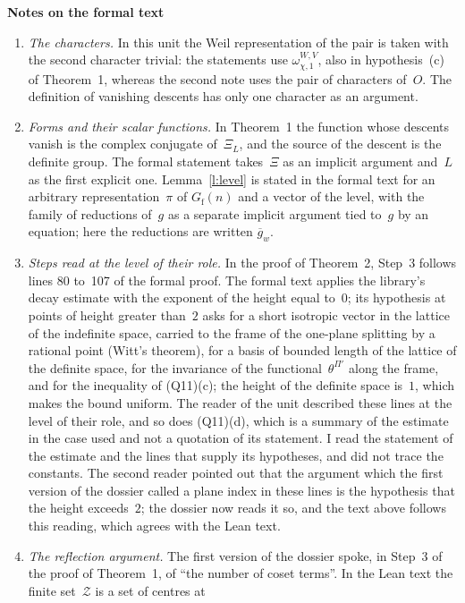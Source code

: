 \documentclass[11pt,a4paper]{article}
\newcommand{\m}[1]{\mbox{$#1$}}        %
\newcommand{\sect}[2]{\refstepcounter{section}\label{#2}\par\addvspace{19pt plus 4pt minus 2pt}\Needspace{7\baselineskip}%
  \noindent\llap{{\fontsize{13.2}{16}\selectfont\bfseries\color{inkfaint}\thesection}\hspace{9pt}}%
  {\fontsize{13.2}{16}\selectfont\bfseries\color{ink}#1}\par\nopagebreak\vspace{-1pt}}
\theoremstyle{plainx}
\theoremstyle{uprightx}
\newcommand{\Gfin}[1]{G_{\mathrm{f}}(#1)}
\newcommand{\coef}[2]{#2_{#1}}
\newcommand{\thd}{\theta^{\Pi\prime}}
\newcommand{\conj}[1]{\overline{#1}}
\begin{document}
\sect{Notes on the formal text}{s:notes}
\begin{enumerate}[label=\textup{\arabic*.},leftmargin=1.6em,itemsep=5pt]
\item \emph{The characters.} In this unit the Weil representation of the pair is taken with the second
character trivial: the statements use \m{\omega^{W,V}_{\chi,1}}, also in hypothesis~(c) of Theorem~1, whereas the
second note uses the pair of characters of~$O$. The definition of vanishing descents has only one character as
an argument.
\item \emph{Forms and their scalar functions.} In Theorem~1 the function whose descents vanish is the complex
conjugate of~\m{\coef{L}{\Xi}}, and the source of the descent is the definite group. The formal statement takes~$\Xi$
as an implicit argument and~$L$ as the first explicit one. Lemma~\ref{l:level} is stated in the formal text for an
arbitrary representation~$\pi$ of \m{\Gfin{n}} and a vector of the level, with the family of reductions of~$g$ as
a separate implicit argument tied to~$g$ by an equation; here the reductions are written \m{\conj{g}_{w}}.
\item \emph{Steps read at the level of their role.} In the proof of Theorem~2, Step~3 follows lines 80 to~107 of
the formal proof. The formal text applies the library's decay estimate with the exponent of the height equal
to~$0$; its hypothesis at points of height greater than~$2$ asks for a short isotropic vector in the lattice of
the indefinite space, carried to the frame of the one-plane splitting by a rational point (Witt's theorem), for
a basis of bounded length of the lattice of the definite space, for the invariance of the functional~$\thd$
along the frame, and for the inequality of (Q11)(c); the height of the definite space is~$1$, which makes the
bound uniform. The reader of the unit described these lines at the level of their role, and so does (Q11)(d),
which is a summary of the estimate in the case used and not a quotation of its statement. I read the statement
of the estimate and the lines that supply its hypotheses, and did not trace the constants. The second reader
pointed out that the argument which the first version of the dossier called a plane index in these lines is the
hypothesis that the height exceeds~$2$; the dossier now reads it so, and the text above follows this reading,
which agrees with the Lean text.
\item \emph{The reflection argument.} The first version of the dossier spoke, in Step~3 of the proof of
Theorem~1, of ``the number of coset terms''. In the Lean text the finite set~$\mathcal{Z}$ is a set of centres at

\end{enumerate}
\end{document}
